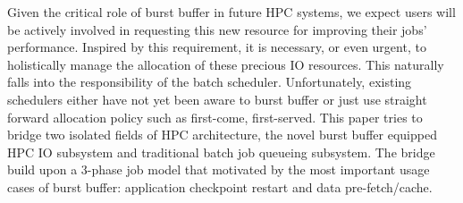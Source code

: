 

Given the critical role of burst buffer in future HPC systems,
we expect users will be actively involved in requesting this new resource for
improving their jobs' performance.
Inspired by this requirement, it is necessary, or even urgent, to holistically manage
the allocation of these precious IO resources.
This naturally falls into the responsibility of the batch scheduler.
Unfortunately, existing schedulers
either have not yet been aware to burst buffer\cite{Moab, Cobalt}
or just use straight forward allocation policy such as first-come, first-served\cite{SlurmBBGuide}.
This paper tries to bridge two isolated fields of HPC architecture,
the novel burst buffer equipped HPC IO subsystem and
traditional batch job queueing subsystem.
The bridge build upon a 3-phase job model that motivated by the most
important usage cases of burst buffer:
application checkpoint restart and data pre-fetch/cache.

